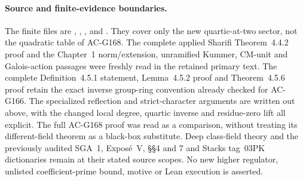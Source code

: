 \paragraph{Source and finite-evidence boundaries.}
The finite files are ,
,
, and
.
They cover only the new quartic-at-two sector, not the
quadratic table of AC-G168.
The complete applied Sharifi Theorem~4.4.2 proof and the
Chapter~1 norm/extension, unramified Kummer, CM-unit and
Galois-action passages were freshly read in the retained
primary text.  The complete Definition~4.5.1 statement,
Lemma~4.5.2 proof and Theorem~4.5.6 proof retain the exact
inverse group-ring convention already checked for AC-G166.
The specialized reflection and strict-character arguments
are written out above, with the changed local degree, quartic
inverse and residue-zero lift all explicit.
The full AC-G168 proof was read as a comparison, without
treating its different-field theorem as a black-box substitute.
Deep class-field theory and the previously audited SGA~1,
Expos\'e~V, \S\S4 and 7 and Stacks tag~03PK dictionaries remain
at their stated source scopes.  No new higher regulator,
unlisted coefficient-prime bound, motive or Lean execution
is asserted.
